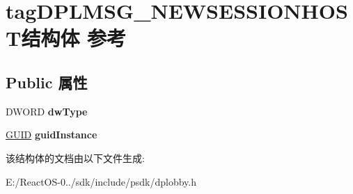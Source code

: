 \hypertarget{structtag_d_p_l_m_s_g___n_e_w_s_e_s_s_i_o_n_h_o_s_t}{}\section{tag\+D\+P\+L\+M\+S\+G\+\_\+\+N\+E\+W\+S\+E\+S\+S\+I\+O\+N\+H\+O\+S\+T结构体 参考}
\label{structtag_d_p_l_m_s_g___n_e_w_s_e_s_s_i_o_n_h_o_s_t}
\subsection*{Public 属性}
\begin{DoxyCompactItemize}
\item 
\mbox{\label{structtag_d_p_l_m_s_g___n_e_w_s_e_s_s_i_o_n_h_o_s_t_ad6df50d4aad6c52395953d600c50db3e}} 
D\+W\+O\+RD {\bfseries dw\+Type}
\item 
\mbox{\label{structtag_d_p_l_m_s_g___n_e_w_s_e_s_s_i_o_n_h_o_s_t_a1eb2e487cb28f91ad31f2bdb7907ddce}} 
\hyperlink{interface_g_u_i_d}{G\+U\+ID} {\bfseries guid\+Instance}
\end{DoxyCompactItemize}


该结构体的文档由以下文件生成\+:\begin{DoxyCompactItemize}
\item 
E\+:/\+React\+O\+S-\/0../sdk/include/psdk/dplobby.\+h\end{DoxyCompactItemize}
